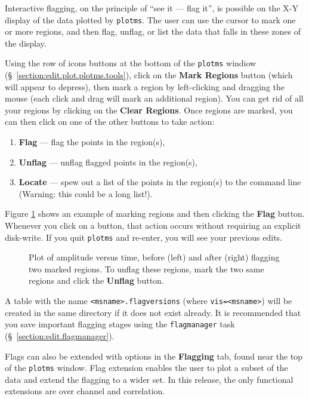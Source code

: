 Interactive flagging, on the principle of ``see it --- flag it'', is possible on the X-Y display of the data plotted by {\tt plotms}.  The user can
use the cursor to mark one or more regions, and then flag, unflag, or list the data that falls in these zones of the display.

Using the row of icons buttons at the bottom of the {\tt plotms} windiow (\S~\ref{section:edit.plot.plotms.tools}), click on the {\bf Mark Regions} button (which will appear to depress), then mark a region by left-clicking and dragging the mouse (each click and drag will mark an additional region).  You can get rid of all your regions by clicking on the {\bf Clear Regions}. Once regions are marked, you can then click on one of the other buttons to take action:
\begin{enumerate}
\item {\bf Flag} --- flag the points in the region(s),
\item {\bf Unflag} --- unflag flagged points in the region(s),
\item {\bf Locate} --- spew out a list of the points in the region(s) to the command line (Warning: this could be a long list!).
\end{enumerate}
Figure \ref{fig:markflags} shows an example of marking regions and then clicking the {\bf Flag} button. Whenever you click on a button, that action occurs without requiring an explicit disk-write.  If you quit {\tt plotms} and re-enter, you will see your previous edits.

\begin{figure}[h!]
\begin{center}
\caption{\label{fig:markflags} Plot of amplitude versus time, before (left) and after (right) flagging two marked regions. To unflag these regions, mark the two same regions and click the {\bf Unflag} button.}
\hrulefill
\end{center}
\end{figure}

A table with the name {\tt <msname>.flagversions} (where {\tt vis=<msname>}) will be created in the same directory if it does not exist already. It is recommended that you save important flagging stages using the {\tt flagmanager} task (\S~\ref{section:edit.flagmanager}).

Flags can also be extended with options in the {\bf Flagging} tab, found near the top of the {\tt plotms} window. Flag extension enables the user to plot a subset of the data and extend the flagging to a wider set. In this release, the only functional extensions are over channel and correlation.

